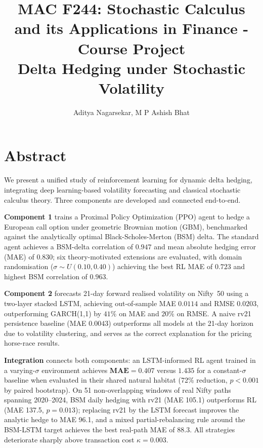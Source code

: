 \documentclass[12pt,a4paper]{article}
\title{%
  \Large\textbf{MAC F244: Stochastic Calculus and its
Applications in Finance - Course Project}\\[0.8em]
  \large Delta Hedging under Stochastic Volatility
}
\author{Aditya Nagarsekar, M P Ashish Bhat}
\date{}
\begin{document}
\maketitle
\thispagestyle{empty}

\tableofcontents


\section*{Abstract}

We present a unified study of reinforcement learning for dynamic delta hedging,
integrating deep learning-based volatility forecasting and classical stochastic
calculus theory.  Three components are developed and connected end-to-end.

\textbf{Component 1} trains a Proximal Policy Optimization (PPO) agent to
hedge a European call option under geometric Brownian motion (GBM), benchmarked
against the analytically optimal Black-Scholes-Merton (BSM) delta.  The
standard agent achieves a BSM-delta correlation of $0.947$ and mean absolute
hedging error (MAE) of $0.830$; six theory-motivated extensions are evaluated,
with domain randomisation ($\sigma\sim U(0.10,0.40)$) achieving the best RL
MAE of $\mathbf{0.723}$ and highest BSM correlation of $\mathbf{0.963}$.

\textbf{Component 2} forecasts 21-day forward realised volatility on Nifty~50
using a two-layer stacked LSTM, achieving out-of-sample MAE $0.0114$ and RMSE
$0.0203$, outperforming GARCH(1,1) by $41\%$ on MAE and $20\%$ on RMSE.  A
naive rv21 persistence baseline (MAE $0.0043$) outperforms all models at the
21-day horizon due to volatility clustering, and serves as the correct
explanation for the pricing horse-race results.

\textbf{Integration} connects both components: an LSTM-informed RL agent
trained in a varying-$\sigma$ environment achieves $\mathbf{MAE = 0.407}$
versus $1.435$ for a constant-$\sigma$ baseline when evaluated in their shared
natural habitat (72\% reduction, $p < 0.001$ by paired bootstrap).  On 51
non-overlapping windows of real Nifty paths spanning 2020--2024, BSM daily
hedging with rv21 (MAE 105.1) outperforms RL (MAE 137.5, $p=0.013$); replacing
rv21 by the LSTM forecast improves the analytic hedge to MAE 96.1, and a mixed
partial-rebalancing rule around the BSM-LSTM target achieves the best real-path
MAE of 88.3.  All strategies deteriorate sharply above transaction cost
$\kappa = 0.003$.
\end{document}
